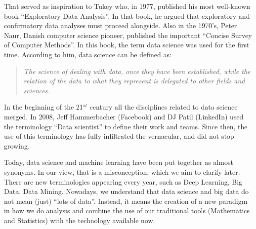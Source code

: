 That served as inspiration to Tukey who, in 1977, published his most well-known book ``Exploratory Data Analysis''. In that book, he argued that exploratory and confirmatory data analyses must proceed alongside. Also in the 1970's, Peter Naur, Danish computer science pioneer, published the important ``Concise Survey of Computer Methods''. In this book, the term data science was used for the first time. According to him, data science can be defined as:
\begin{quotation}
\textit{The science of dealing with data, once they have been established, while the relation of the data to what they represent is delegated to other fields and sciences.}
\end{quotation} 

In the beginning of the 21$^{st}$ century all the disciplines related to data science merged. In 2008, Jeff Hammerbacher (Facebook) and DJ Patil (LinkedIn) used the terminology ``Data scientist'' to define their work and teams. Since then, the use of this terminology has fully infiltrated the vernacular, and did not stop growing. 

Today, data science and machine learning have been put together as almost synonyms. In our view, that is a misconception, which we aim to clarify later. There are new terminologies appearing every year, such as Deep Learning, Big Data, Data Mining. Nowadays, we understand that data science and big data do not mean (just) ``lots of data''. Instead, it means the creation of a new paradigm in how we do analysis and combine the use of our traditional tools (Mathematics and Statistics) with the technology available now.%
